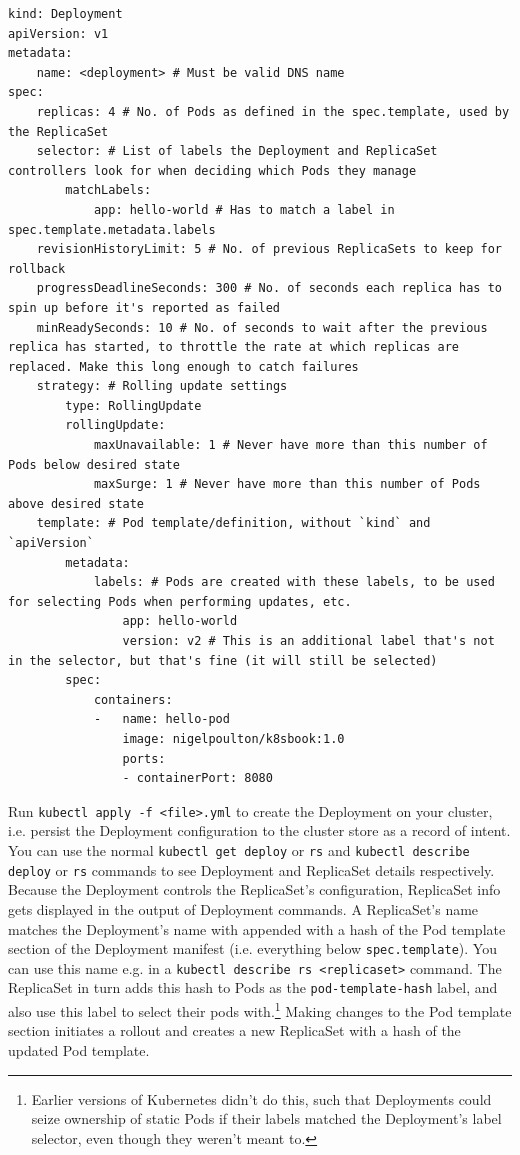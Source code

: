 \documentclass[table, xcdraw]{article}%
\begin{document}
\begin{verbatim}
kind: Deployment
apiVersion: v1
metadata:
    name: <deployment> # Must be valid DNS name
spec:
    replicas: 4 # No. of Pods as defined in the spec.template, used by the ReplicaSet
    selector: # List of labels the Deployment and ReplicaSet controllers look for when deciding which Pods they manage
        matchLabels:
            app: hello-world # Has to match a label in spec.template.metadata.labels
    revisionHistoryLimit: 5 # No. of previous ReplicaSets to keep for rollback
    progressDeadlineSeconds: 300 # No. of seconds each replica has to spin up before it's reported as failed
    minReadySeconds: 10 # No. of seconds to wait after the previous replica has started, to throttle the rate at which replicas are replaced. Make this long enough to catch failures
    strategy: # Rolling update settings
        type: RollingUpdate
        rollingUpdate:
            maxUnavailable: 1 # Never have more than this number of Pods below desired state
            maxSurge: 1 # Never have more than this number of Pods above desired state
    template: # Pod template/definition, without `kind` and `apiVersion`
        metadata:
            labels: # Pods are created with these labels, to be used for selecting Pods when performing updates, etc.
                app: hello-world
                version: v2 # This is an additional label that's not in the selector, but that's fine (it will still be selected)
        spec:
            containers:
            -   name: hello-pod
                image: nigelpoulton/k8sbook:1.0
                ports:
                - containerPort: 8080
\end{verbatim}

Run \texttt{kubectl apply -f <file>.yml} to create the Deployment on your cluster, i.e. persist the Deployment configuration to the cluster store as a record of intent. You can use the normal \texttt{kubectl get deploy} or \texttt{rs} and \texttt{kubectl describe deploy} or \texttt{rs} commands to see Deployment and ReplicaSet details respectively. Because the Deployment controls the ReplicaSet’s configuration, ReplicaSet info gets displayed in the output of Deployment commands. A ReplicaSet's name matches the Deployment’s name with appended with a hash of the Pod template section of the Deployment manifest (i.e. everything below \texttt{spec.template}). You can use this name e.g. in a \texttt{kubectl describe rs <replicaset>} command. The ReplicaSet in turn adds this hash to Pods as the \texttt{pod-template-hash} label, and also use this label to select their pods with.\footnote{Earlier versions of Kubernetes didn't do this, such that Deployments could seize ownership of static Pods if their labels matched the Deployment’s label selector, even though they weren't meant to.} Making changes to the Pod template section initiates a rollout and creates a new ReplicaSet with a hash of the updated Pod template.
\end{document}
